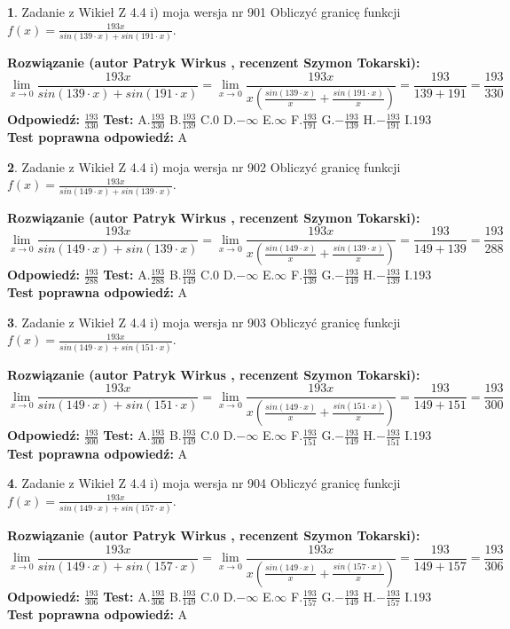 \documentclass[12pt, a4paper]{article}
\theoremstyle{definition} %
\newtheorem{zad}{}
\newcommand{\zadStart}[1]{\begin{zad}#1\newline}
\newcommand{\zadStop}{\end{zad}}
\newcommand{\rozwStart}[2]{\noindent \textbf{Rozwiązanie (autor #1 , recenzent #2): }\newline}
\newcommand{\rozwStop}{\newline}
\newcommand{\odpStart}{\noindent \textbf{Odpowiedź:}\newline}
\newcommand{\odpStop}{\newline}
\newcommand{\testStart}{\noindent \textbf{Test:}\newline}
\newcommand{\testStop}{\newline}
\newcommand{\kluczStart}{\noindent \textbf{Test poprawna odpowiedź:}\newline}
\newcommand{\kluczStop}{\newline}
\begin{document}
\zadStart{Zadanie z Wikieł Z 4.4 i) moja wersja nr 901}
Obliczyć granicę funkcji $f(x)=\frac{193x}{sin(139\cdot x) +sin(191\cdot x)}$.
\zadStop
\rozwStart{Patryk Wirkus}{Szymon Tokarski}
$$\lim\limits_{x\to 0}\frac{193x}{sin(139\cdot x) +sin(191\cdot x)}=\lim\limits_{x\to 0}\frac{193x}{x(\frac{sin(139\cdot x)}{x}+\frac{sin(191\cdot x)}{x})}=\frac{193}{139+191} = \frac{193}{330}$$
\rozwStop
\odpStart
$\frac{193}{330}$
\odpStop
\testStart
A.$\frac{193}{330}$
B.$\frac{193}{139}$
C.$0$
D.$-\infty$
E.$\infty$
F.$\frac{193}{191}$
G.$-\frac{193}{139}$
H.$-\frac{193}{191}$
I.$193$
\testStop
\kluczStart
A
\kluczStop



\zadStart{Zadanie z Wikieł Z 4.4 i) moja wersja nr 902}
Obliczyć granicę funkcji $f(x)=\frac{193x}{sin(149\cdot x) +sin(139\cdot x)}$.
\zadStop
\rozwStart{Patryk Wirkus}{Szymon Tokarski}
$$\lim\limits_{x\to 0}\frac{193x}{sin(149\cdot x) +sin(139\cdot x)}=\lim\limits_{x\to 0}\frac{193x}{x(\frac{sin(149\cdot x)}{x}+\frac{sin(139\cdot x)}{x})}=\frac{193}{149+139} = \frac{193}{288}$$
\rozwStop
\odpStart
$\frac{193}{288}$
\odpStop
\testStart
A.$\frac{193}{288}$
B.$\frac{193}{149}$
C.$0$
D.$-\infty$
E.$\infty$
F.$\frac{193}{139}$
G.$-\frac{193}{149}$
H.$-\frac{193}{139}$
I.$193$
\testStop
\kluczStart
A
\kluczStop



\zadStart{Zadanie z Wikieł Z 4.4 i) moja wersja nr 903}
Obliczyć granicę funkcji $f(x)=\frac{193x}{sin(149\cdot x) +sin(151\cdot x)}$.
\zadStop
\rozwStart{Patryk Wirkus}{Szymon Tokarski}
$$\lim\limits_{x\to 0}\frac{193x}{sin(149\cdot x) +sin(151\cdot x)}=\lim\limits_{x\to 0}\frac{193x}{x(\frac{sin(149\cdot x)}{x}+\frac{sin(151\cdot x)}{x})}=\frac{193}{149+151} = \frac{193}{300}$$
\rozwStop
\odpStart
$\frac{193}{300}$
\odpStop
\testStart
A.$\frac{193}{300}$
B.$\frac{193}{149}$
C.$0$
D.$-\infty$
E.$\infty$
F.$\frac{193}{151}$
G.$-\frac{193}{149}$
H.$-\frac{193}{151}$
I.$193$
\testStop
\kluczStart
A
\kluczStop



\zadStart{Zadanie z Wikieł Z 4.4 i) moja wersja nr 904}
Obliczyć granicę funkcji $f(x)=\frac{193x}{sin(149\cdot x) +sin(157\cdot x)}$.
\zadStop
\rozwStart{Patryk Wirkus}{Szymon Tokarski}
$$\lim\limits_{x\to 0}\frac{193x}{sin(149\cdot x) +sin(157\cdot x)}=\lim\limits_{x\to 0}\frac{193x}{x(\frac{sin(149\cdot x)}{x}+\frac{sin(157\cdot x)}{x})}=\frac{193}{149+157} = \frac{193}{306}$$
\rozwStop
\odpStart
$\frac{193}{306}$
\odpStop
\testStart
A.$\frac{193}{306}$
B.$\frac{193}{149}$
C.$0$
D.$-\infty$
E.$\infty$
F.$\frac{193}{157}$
G.$-\frac{193}{149}$
H.$-\frac{193}{157}$
I.$193$
\testStop
\kluczStart
A
\kluczStop
\end{document}
